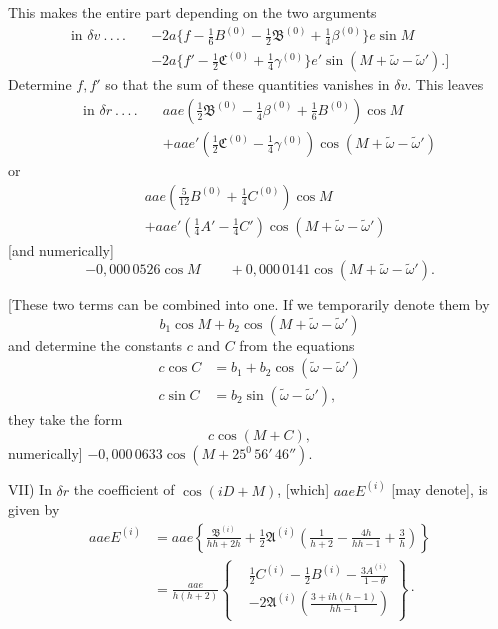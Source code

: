 This makes the entire part depending on the two arguments
\[
\begin{aligned}
\text{in }\delta v\ .\, .\, .\, .\quad&-2a\{f-\tfrac16B^{(0)}-\tfrac12\mathfrak B^{(0)}+\tfrac14\beta^{(0)}\}e\sin M\\
&-2a\{f'-\tfrac12\mathfrak C^{(0)}+\tfrac14\gamma^{(0)}\}e'\sin(M+\tilde\omega-\tilde\omega').]
\end{aligned}
\]
Determine \(f,f'\) so that the sum of these quantities vanishes in \(\delta v\). This leaves
\[
\begin{aligned}
\text{in }\delta r\ .\, .\, .\, .\quad&aae(\tfrac12\mathfrak B^{(0)}-\tfrac14\beta^{(0)}+\tfrac16B^{(0)})\cos M\\
&+aae'(\tfrac12\mathfrak C^{(0)}-\tfrac14\gamma^{(0)})\cos(M+\tilde\omega-\tilde\omega')
\end{aligned}
\]
or
\[
\begin{aligned}
&aae(\tfrac5{12}B^{(0)}+\tfrac14C^{(0)})\cos M\\
&+aae'(\tfrac14A'-\tfrac14C')\cos(M+\tilde\omega-\tilde\omega')
\end{aligned}
\]
[and numerically]
\[
-0{,}000\,0526\cos M\qquad+0{,}000\,0141\cos(M+\tilde\omega-\tilde\omega').
\]

[These two terms can be combined into one. If we temporarily denote them by
\[
b_1\cos M+b_2\cos(M+\tilde\omega-\tilde\omega')
\]
and determine the constants \(c\) and \(C\) from the equations
\[
\begin{aligned}
c\cos C&=b_1+b_2\cos(\tilde\omega-\tilde\omega')\\
c\sin C&=b_2\sin(\tilde\omega-\tilde\omega'),
\end{aligned}
\]
they take the form
\[
c\cos(M+C),
\]
numerically] \(-0{,}000\,0633\cos(M+25^{0}\,56'\,46'').\)

VII) In \(\delta r\) the coefficient of \(\cos(iD+M)\), [which] \(aaeE^{(i)}\) [may denote], is given by
\[
\begin{aligned}
aaeE^{(i)}&=aae\left\{\frac{\mathfrak B^{(i)}}{hh+2h}+\tfrac12\mathfrak A^{(i)}\left(\frac1{h+2}-\frac{4h}{hh-1}+\frac3h\right)\right\}\\
&=\frac{aae}{h(h+2)}\left\{\begin{aligned}
&\tfrac12C^{(i)}-\tfrac12B^{(i)}-\frac{3A^{(i)}}{1-\theta}\\
&-2\mathfrak A^{(i)}\left(\frac{3+ih(h-1)}{hh-1}\right)
\end{aligned}\right\}\mathpunct{\cdot}
\end{aligned}
\]

